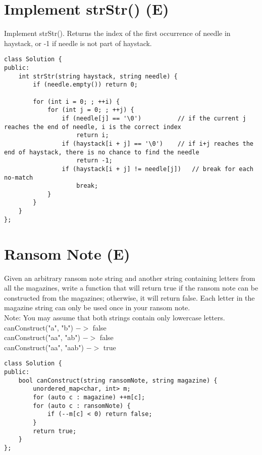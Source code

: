 \section{Implement strStr() (E)}
Implement strStr(). Returns the index of the first occurrence of needle in haystack, or -1 if needle is not part of haystack. \\

\begin{lstlisting}
class Solution {
public:
    int strStr(string haystack, string needle) {
        if (needle.empty()) return 0;

        for (int i = 0; ; ++i) {
            for (int j = 0; ; ++j) {
                if (needle[j] == '\0')          // if the current j reaches the end of needle, i is the correct index
                    return i;
                if (haystack[i + j] == '\0')    // if i+j reaches the end of haystack, there is no chance to find the needle
                    return -1;
                if (haystack[i + j] != needle[j])   // break for each no-match
                    break;
            }
        }
    }
};
\end{lstlisting}


\section{Ransom Note (E)}
Given an arbitrary ransom note string and another string containing letters from all the magazines, write a function that will return true if the ransom note can be constructed from the magazines; otherwise, it will return false. Each letter in the magazine string can only be used once in your ransom note. \\

Note:
You may assume that both strings contain only lowercase letters.\\

canConstruct("a", "b") $->$ false\\
canConstruct("aa", "ab") $->$ false\\
canConstruct("aa", "aab") $->$ true\\

\begin{lstlisting}
class Solution {
public:
    bool canConstruct(string ransomNote, string magazine) {
        unordered_map<char, int> m;
        for (auto c : magazine) ++m[c];
        for (auto c : ransomNote) {
            if (--m[c] < 0) return false;
        }
        return true;
    }
};
\end{lstlisting}


